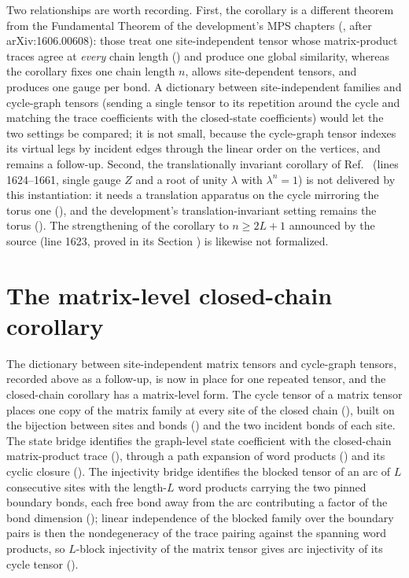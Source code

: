 \documentclass{article}
\begin{document}
Two relationships are worth recording.  First, the corollary is a different
theorem from the Fundamental Theorem of the development's MPS chapters
(, after arXiv:1606.00608): those treat
one site-independent tensor whose matrix-product traces agree at \emph{every}
chain length () and produce one global similarity, whereas the
corollary fixes one chain length $n$, allows site-dependent tensors, and
produces one gauge per bond.  A dictionary between site-independent
 families and cycle-graph tensors (sending a single tensor to
its repetition around the cycle and matching the trace coefficients with the
closed-state coefficients) would let the two settings be compared; it is not
small, because the cycle-graph tensor indexes its virtual legs by incident
edges through the linear order on the vertices, and remains a follow-up.
Second, the translationally invariant corollary of
Ref.~\cite{Molnar2018NormalPEPS} (lines 1624--1661,
single gauge $Z$ and a root of unity $\lambda$ with $\lambda^n=1$) is not
delivered by this instantiation: it needs a translation apparatus on the
cycle mirroring the torus one (), and
the development's translation-invariant setting remains the torus
().  The
strengthening of the corollary to $n\geq 2L+1$ announced by the source
(line 1623, proved in its Section ) is likewise not
formalized.

\section*{The matrix-level closed-chain corollary}

The dictionary between site-independent matrix tensors and cycle-graph
tensors, recorded above as a follow-up, is now in place for one repeated
tensor, and the closed-chain corollary has a matrix-level form.  The cycle
tensor of a matrix tensor places one copy of the matrix family at every site
of the closed chain (), built on the bijection
between sites and bonds () and the two incident bonds
of each site.  The state bridge identifies the graph-level state coefficient
with the closed-chain matrix-product trace
(), through a path expansion of word
products () and its cyclic closure
().  The injectivity bridge
identifies the blocked tensor of an arc of $L$ consecutive sites with the
length-$L$ word products carrying the two pinned boundary bonds, each free
bond away from the arc contributing a factor of the bond dimension
(); linear independence of the
blocked family over the boundary pairs is then the nondegeneracy of the
trace pairing against the spanning word products, so $L$-block injectivity
of the matrix tensor gives arc injectivity of its cycle tensor
().
\end{document}
